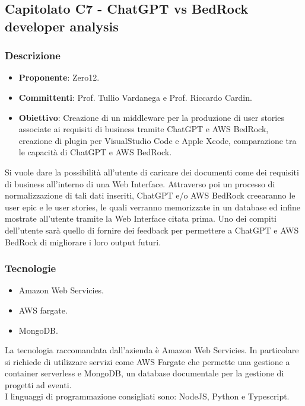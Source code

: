 \subsection{Capitolato C7 - ChatGPT vs BedRock developer analysis}


\subsubsection{Descrizione}
\begin{itemize}
    \item \textbf{Proponente}: Zero12.
    \item \textbf{Committenti}: Prof. Tullio Vardanega e Prof. Riccardo Cardin.
    \item \textbf{Obiettivo}: Creazione di un middleware per la produzione di user stories associate ai requisiti di business tramite ChatGPT e AWS BedRock, creazione di plugin per VisualStudio Code e Apple Xcode, comparazione tra le capacità di ChatGPT e AWS BedRock.
\end{itemize}
Si vuole dare la possibilità all'utente di caricare dei documenti come dei requisiti di business all'interno di una Web Interface. Attraverso poi un processo di normalizzazione di tali dati inseriti,
ChatGPT e/o AWS BedRock creearanno le user epic e le user stories, le quali verranno memorizzate in un database ed infine mostrate all'utente tramite la Web Interface citata prima.
Uno dei compiti dell'utente sarà quello di fornire dei feedback per permettere a ChatGPT e AWS BedRock di migliorare i loro output futuri.


\subsubsection{Tecnologie}
\begin{itemize}
    \item Amazon Web Servicies.
    \item AWS fargate.
    \item MongoDB.
\end{itemize}
La tecnologia raccomandata dall'azienda è Amazon Web Servicies. In particolare si richiede di utilizzare servizi come
AWS Fargate che permette una gestione a container serverless e MongoDB, un database documentale per la gestione di progetti ad eventi. \\
I linguaggi di programmazione consigliati sono: NodeJS, Python e Typescript.


